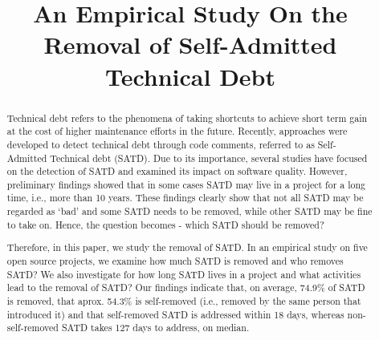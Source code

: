 \documentclass[10pt, conference]{IEEEtran}
\begin{document}
\title{An Empirical Study On the Removal of Self-Admitted Technical Debt}
\author{
}

\maketitle
\begin{abstract}
Technical debt refers to the phenomena of taking shortcuts to achieve short term gain at the cost of higher maintenance efforts in the future. Recently, approaches were developed to detect technical debt through code comments, referred to as Self-Admitted Technical debt (SATD). Due to its importance, several studies have focused on the detection of SATD and examined its impact on software quality. However, preliminary findings showed that in some cases SATD may live in a project for a long time, i.e., more than 10 years. These findings clearly show that not all SATD may be regarded as `bad' and some SATD needs to be removed, while other SATD may be fine to take on. Hence, the question becomes - which SATD should be removed?

Therefore, in this paper, we study the removal of SATD. In an empirical study on five open source projects, we examine how much SATD is removed and who removes SATD? We also investigate for how long SATD lives in a project and what activities lead to the removal of SATD? Our findings indicate that, on average, 74.9\% of SATD is removed, that aprox. 54.3\% is self-removed (i.e., removed by the same person that introduced it) and that self-removed SATD is addressed within 18 days, whereas non-self-removed SATD takes 127 days to address, on median.
\end{abstract}
\end{document}
